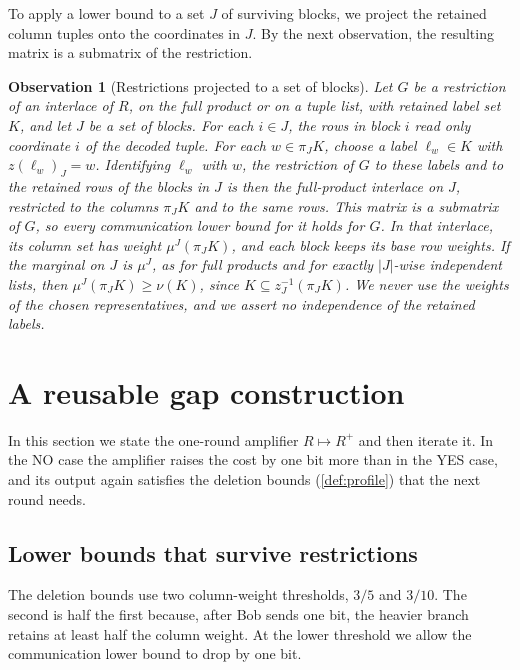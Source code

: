 \documentclass[11pt,letterpaper]{article} \usepackage[utf8]{inputenc}
\theoremstyle{plain} \newtheorem{theorem}{Theorem}[section]
\newtheorem{observation}[observation]{Observation}
\theoremstyle{definition} \newaliascnt{definition}{theorem}
\begin{document}
To apply a lower bound to a set $J$ of surviving blocks, we project the retained
column tuples onto the coordinates in $J$. By the next observation, the resulting
matrix is a submatrix of the restriction.

\begin{observation}[Restrictions projected to a set of blocks]\label{obs:representatives}
Let $G$ be a restriction of an interlace of $R$, on the full product or on
a tuple list, with retained label set $K$, and let $J$ be a set of blocks.
For each $i\in J$, the rows in block $i$ read only coordinate $i$ of the
decoded tuple. For each $w\in\pi_JK$, choose
a label $\ell_w\in K$ with $z(\ell_w)_J=w$. Identifying $\ell_w$ with $w$, the restriction of $G$ to these labels and to the
retained rows of the blocks in $J$ is then the full-product interlace on $J$,
restricted to the columns $\pi_JK$ and to the same rows. This matrix is a submatrix of $G$,
so every communication lower bound for it holds for $G$. In that interlace,
its column set has weight $\mu^J(\pi_JK)$, and each
block keeps its base row weights. If the marginal on $J$ is $\mu^J$, as for
full products and for exactly $|J|$-wise independent lists, then
$\mu^J(\pi_JK)\ge\nu(K)$, since $K\subseteq z_J^{-1}(\pi_JK)$. We never use
the weights of the chosen representatives, and we assert no independence of
the retained labels.
\end{observation}


\section{A reusable gap construction}
\label{sec:unrestricted}

In this section we state the one-round amplifier \(R\mapsto R^+\) and then
iterate it. In the NO case the amplifier raises the cost by one bit more than
in the YES case, and its output again satisfies the deletion bounds
(\cref{def:profile}) that the next round needs.

\subsection{Lower bounds that survive restrictions}

The deletion bounds use two column-weight thresholds, \(3/5\) and \(3/10\).
The second is half the first because, after Bob sends one bit, the heavier
branch retains at least half the column weight. At the lower threshold we
allow the communication lower bound to drop by one bit.
\end{document}
